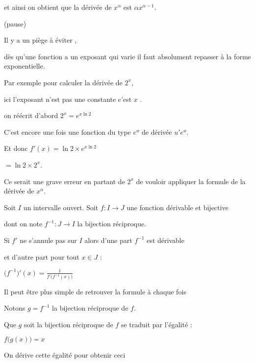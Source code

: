 \change

et ainsi on obtient que la dérivée de $x^\alpha$ est $\alpha x^{\alpha-1}.$

(pause)


\change


Il y a un piège à éviter , 

dès qu'une fonction a un exposant qui varie  il faut absolument 
repasser à la forme exponentielle.

\change


Par exemple pour calculer la dérivée de $2^x$,

ici l'exposant n'est pas une constante c'est $x$ .

\change

on réécrit d'abord $2^x=e^{x\ln 2}$ 

\change

C'est encore une fois une fonction du type $e^u$ de dérivée $u'e^u$.

Et donc $f'(x)=\ln 2 \times e^{x\ln 2}$


\change

$ = \ln 2 \times 2^x $.

Ce serait une grave erreur en partant de $2^x$ de vouloir 
appliquer la formule de la dérivée de $x^\alpha$.

\diapo


Soit $I$ un intervalle ouvert. Soit $f : I \to J$ une fonction dérivable et bijective 

dont on note $f^{-1} : J \to I$ la bijection réciproque. 

\change

Si $f'$ ne s'annule pas sur $I$ alors d'une part 
$f^{-1}$ est dérivable 

\change

et d'autre part pour tout $x \in J$ :

$\big(f^{-1}\big)'(x)= \frac{1}{f'\big( f^{-1}(x) \big)} $

\change


Il peut être plus simple de retrouver la formule à chaque fois

Notons $g=f^{-1}$ la bijection réciproque de $f$.

\change

Que $g$ soit la bijection réciproque de $f$ se traduit par l'égalité :

$f\big( g(x) \big)  = x$

\change

On dérive cette égalité pour obtenir ceci 

